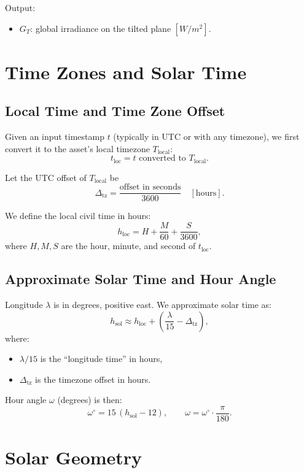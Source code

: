 \documentclass[11pt,a4paper]{article}
\begin{document}
Output:
\begin{itemize}
  \item \(G_T\): global irradiance on the tilted plane \([\si{W/m^2}]\).
\end{itemize}

\section{Time Zones and Solar Time}

\subsection{Local Time and Time Zone Offset}

Given an input timestamp \(t\) (typically in UTC or with any timezone), we first convert it to the asset's local timezone \(T_{\text{local}}\):
\[
  t_{\text{loc}} = t \text{ converted to } T_{\text{local}}.
\]

Let the UTC offset of \(T_{\text{local}}\) be
\[
  \Delta_{\text{tz}} = \frac{\text{offset in seconds}}{3600} \quad [\text{hours}].
\]

We define the local civil time in hours:
\[
  h_{\text{loc}} = H + \frac{M}{60} + \frac{S}{3600},
\]
where \(H, M, S\) are the hour, minute, and second of \(t_{\text{loc}}\).

\subsection{Approximate Solar Time and Hour Angle}

Longitude \(\lambda\) is in degrees, positive east.
We approximate solar time as:
\[
  h_{\text{sol}} \approx h_{\text{loc}} + \left(\frac{\lambda}{15} - \Delta_{\text{tz}}\right),
\]
where:
\begin{itemize}
  \item \(\lambda/15\) is the ``longitude time'' in hours,
  \item \(\Delta_{\text{tz}}\) is the timezone offset in hours.
\end{itemize}

Hour angle \(\omega\) (degrees) is then:
\[
  \omega^\circ = 15\,(h_{\text{sol}} - 12),
  \qquad
  \omega = \omega^\circ \cdot \frac{\pi}{180}.
\]

\section{Solar Geometry}
\end{document}
